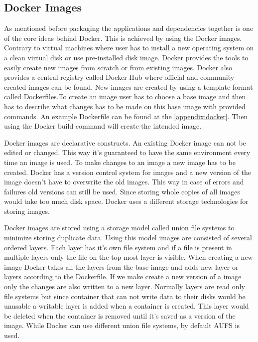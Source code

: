 \documentclass[12pt,oneandhalf,chaparabic,ceng,ms,eng,oneside,pntc]{gsufbe}
\begin{document}
\subsection{Docker Images}
As mentioned before packaging the applications and dependencies together is one of the core ideas
behind Docker.  This is achieved by using the Docker images.  Contrary to virtual machines where user
has to install a new operating system on a clean virtual disk or use pre-installed disk image.  Docker 
provides the tools to easily create new images from scratch or from existing images.  Docker also
provides a central registry called Docker Hub where official and community created images can be found.
New images are created by using a template format called Dockerfiles.To create an image user has to
choose a base image and then has to describe what changes has to be made on this base image with
provided commands.  An example Dockerfile can be found at the \ref{appendix:docker}.  Then using the
Docker build command will create the intended image.

Docker images are declarative constructs.  An existing Docker image can not be edited or changed.  This
way it's guaranteed to have the same environment every time an image is used.  To make changes to an
image a new image has to be created.  Docker has a version control system for images and a new version
of the image doesn't have to overwrite the old images.  This way in case of errors and failures old
versions can still be used.  Since storing whole copies of all images would take too much disk space.
Docker uses a different storage technologies for storing images.

Docker images are stored using a storage model called union file systems to minimize storing duplicate
data.  Using this model images are consisted of several ordered layers.  Each layer has it's own file
system and if a file is present in multiple layers only the file on the top most layer is visible.  When
creating a new image Docker takes all the layers from the base image and adds new layer or layers
according to the Dockerfile.  If we make create a new version of a image only the changes are also 
written to a new layer.  Normally layers are read only file systems but since container that can not
write data to their disks would be unusable a writable layer is added when a container is created.  This
layer would be deleted when the container is removed until it's saved as a version of the image.
While Docker can use different union file systems, by default AUFS is used.
\end{document}
